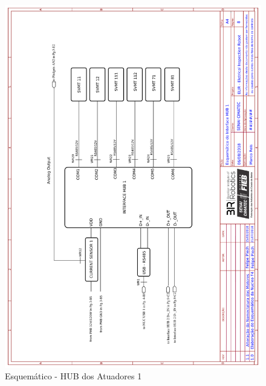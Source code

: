     \begin{figure}[H]
	\centering
	\includegraphics[width=14cm]{Figures/EsquematicoHUB1.png}
	\caption{Esquemático - HUB dos Atuadores 1} \label{HUB1}
	\end{figure}
	
	\pagebreak
	
